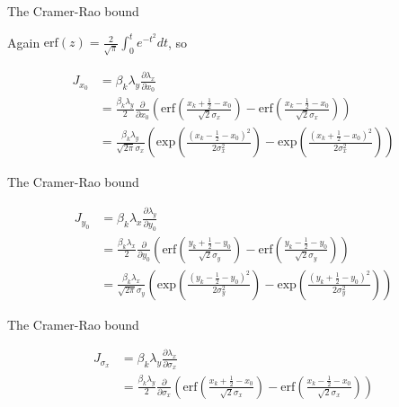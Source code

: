 \documentclass[aspectratio=169]{beamer}
\begin{document}
\begin{frame}{The Cramer-Rao bound}

Again $\mathrm{erf}(z) = \frac{2}{\sqrt{\pi}}\int_{0}^{t}e^{-t^{2}}dt$, so

\begin{align*}
J_{x_{0}} &= \beta_{k}\lambda_{y}\frac{\partial \lambda_{x}}{\partial x_{0}} \\
&= \frac{\beta_{k}\lambda_{y}}{2}\frac{\partial}{\partial x_{0}}\left(\mathrm{erf}\left(\frac{x_{k}+\frac{1}{2}-x_{0}}{\sqrt{2}\sigma_{x}}\right) -\mathrm{erf}\left(\frac{x_{k}-\frac{1}{2}-x_{0}}{\sqrt{2}\sigma_{x}}\right)\right)\\
&= \frac{\beta_{k}\lambda_{y}}{\sqrt{2\pi}\sigma_{x}}\left(\mathrm{exp}\left(\frac{(x_{k}-\frac{1}{2}-x_{0})^{2}}{2\sigma_{x}^{2}}\right) -\mathrm{exp}\left(\frac{(x_{k}+\frac{1}{2}-x_{0})^{2}}{2\sigma_{x}^{2}}\right)\right)
\end{align*}

\end{frame}

\begin{frame}{The Cramer-Rao bound}

\begin{align*}
J_{y_{0}} &= \beta_{k}\lambda_{x}\frac{\partial \lambda_{y}}{\partial y_{0}} \\
&= \frac{\beta_{k}\lambda_{x}}{2}\frac{\partial}{\partial y_{0}}\left(\mathrm{erf}\left(\frac{y_{k}+\frac{1}{2}-y_{0}}{\sqrt{2}\sigma_{y}}\right) -\mathrm{erf}\left(\frac{y_{k}-\frac{1}{2}-y_{0}}{\sqrt{2}\sigma_{y}}\right)\right)\\
&= \frac{\beta_{k}\lambda_{x}}{\sqrt{2\pi}\sigma_{y}}\left(\mathrm{exp}\left(\frac{(y_{k}-\frac{1}{2}-y_{0})^{2}}{2\sigma_{y}^{2}}\right) -\mathrm{exp}\left(\frac{(y_{k}+\frac{1}{2}-y_{0})^{2}}{2\sigma_{y}^{2}}\right)\right)
\end{align*}

\end{frame}

\begin{frame}{The Cramer-Rao bound}

\begin{align*}
J_{\sigma_{x}} &= \beta_{k}\lambda_{y}\frac{\partial \lambda_{x}}{\partial \sigma_{x}} \\
&= \frac{\beta_{k}\lambda_{y}}{2}\frac{\partial}{\partial \sigma_{x}}\left(\mathrm{erf}\left(\frac{x_{k}+\frac{1}{2}-x_{0}}{\sqrt{2}\sigma_{x}}\right) -\mathrm{erf}\left(\frac{x_{k}-\frac{1}{2}-x_{0}}{\sqrt{2}\sigma_{x}}\right)\right)\\
\end{align*}



\end{frame}
\end{document}

